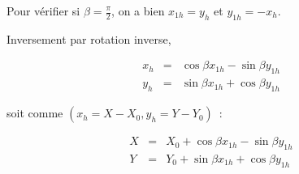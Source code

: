 \documentclass[12pt,twoside]{article}
\begin{document}
Pour vérifier si $\beta = \frac{\pi}{2}$,  on a bien $x_{1h}=y_h$ et $y_{1h}= -x_h$.

Inversement par rotation inverse,

\begin{eqnarray}
x_{h} & = & \cos \beta x_{1h} - \sin \beta y_{1h} \\
y_{h} & = & \sin \beta x_{1h} + \cos \beta y_{1h} 
\end{eqnarray} 

soit comme $(x_h=X-X_0,y_h=Y-Y_0)$~:

\begin{eqnarray}
X  & =  & X_0 +  \cos \beta x_{1h} - \sin \beta y_{1h} \\
Y  & = & Y_0 + \sin \beta x_{1h} + \cos \beta y_{1h} 
\end{eqnarray} 
\end{document}
